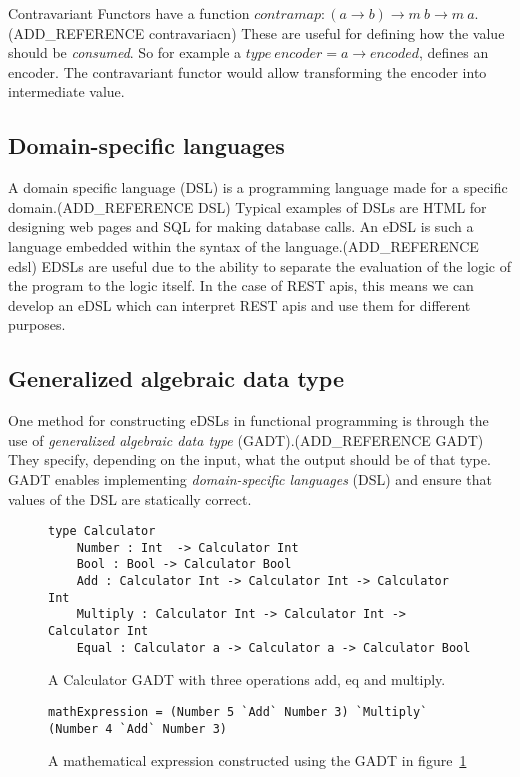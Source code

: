 Contravariant Functors have a function $contramap : (a\rightarrow b) \rightarrow
m\ b \rightarrow m\ a$. (ADD\_REFERENCE contravariacn) These are useful for
defining how the value should be \textit{consumed}. So for example a $type\
encoder = a\rightarrow encoded$, defines an encoder. The contravariant functor
would allow transforming the encoder into intermediate value.

\subsection{Domain-specific languages}

A domain specific language (DSL) is a programming language made for a specific
domain.(ADD\_REFERENCE DSL) Typical examples of DSLs are HTML for designing web
pages and SQL for making database calls. An eDSL is such a language embedded
within the syntax of the language.(ADD\_REFERENCE edsl) EDSLs are useful due to
the ability to separate the evaluation of the logic of the program to the logic
itself. In the case of REST apis, this means we can develop an eDSL which can
interpret REST apis and use them for different purposes. 

\subsection{Generalized algebraic data type}\label{gadt}

One method for constructing eDSLs in functional programming is through the use
of \textit{generalized algebraic data type} (GADT).(ADD\_REFERENCE GADT)  They
specify, depending on the input, what the output should be of that type. GADT
enables implementing \textit{domain-specific languages} (DSL) and ensure
that values of the DSL are statically correct. 

\begin{figure}[H]
    \begin{lstlisting}
type Calculator 
    Number : Int  -> Calculator Int
    Bool : Bool -> Calculator Bool
    Add : Calculator Int -> Calculator Int -> Calculator Int
    Multiply : Calculator Int -> Calculator Int -> Calculator Int
    Equal : Calculator a -> Calculator a -> Calculator Bool
    \end{lstlisting}
    \caption{A Calculator GADT with three operations add, eq and multiply.}
    \label{gadtcalculator}
\end{figure}

\begin{figure}[H]
    \begin{lstlisting}
mathExpression = (Number 5 `Add` Number 3) `Multiply` (Number 4 `Add` Number 3)
    \end{lstlisting}
    \caption{A mathematical expression constructed using the GADT in
    figure~\ref{gadtcalculator}}
    \label{mathexpressiongadt}
\end{figure}



